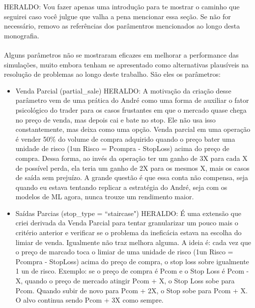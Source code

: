 \color{red} HERALDO: Vou fazer apenas uma introdução para te mostrar o caminho que seguirei caso você julgue que valha a pena mencionar essa seção. Se não for necessário, removo as referências dos parâmentros mencionados ao longo desta monografia.

\paragraph{} Alguns parâmetros não se mostraram eficazes em melhorar a performance das simulações, muito embora tenham se apresentado como alternativas plausíveis na resolução de problemas ao longo deste trabalho. São eles os parâmetros:

\begin{itemize}
    \item Venda Parcial (partial\_sale)
    \color{red} HERALDO: A motivação da criação desse parâmetro vem de uma prática do André como uma forma de auxiliar o fator psicológico do trader para os casos frustantes em que o mercado quase chega no preço de venda, mas depois cai e bate no stop. Ele não usa isso constantemente, mas deixa como uma opção. Venda parcial em uma operação é vender 50\% do volume de compra adquirido quando o preço bater uma unidade de risco (1un Risco = Pcompra - StopLoss) acima do preço de compra. Dessa forma, ao invés da operação ter um ganho de 3X para cada X de possível perda, ela teria um ganho de 2X para os mesmos X, mais os casos de saída sem prejuízo. A grande questão é que essa conta não compensa, seja quando eu estava tentando replicar a estratégia do André, seja com os modelos de ML agora, nunca trouxe um rendimento maior. 

    \item Saídas Parcias (stop\_type = ``staircase")
    \color{red} HERALDO: É uma extensão que criei derivada da Venda Parcial para tentar granularizar um pouco mais o critério anterior e verificar se o problema da ineficácia estava na escolha do limiar de venda. Igualmente não traz melhora alguma. A ideia é: cada vez que o preço de marcado toca o limiar de uma unidade de risco (1un Risco = Pcompra - StopLoss) acima do preço de compra, o stop loss sobre igualmente 1 un de risco. Exemplo: se o preço de compra é Pcom e o Stop Loss é Pcom - X, quando o preço de mercado atingir Pcom + X, o Stop Loss sobe para Pcom. Quando subir de novo para Pcom + 2X, o Stop sobe para Pcom + X. O alvo continua sendo Pcom + 3X como sempre. 


\end{itemize}
